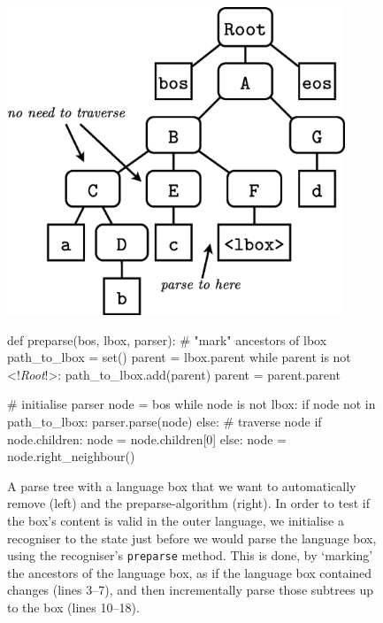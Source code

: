\documentclass[sigplan,screen]{acmart}\settopmatter{printfolios=true,printccs=false,printacmref=false}
\begin{document}
\begin{figure}
\begin{minipage}{0.45\textwidth}
\includegraphics[width=0.9\textwidth]{images/autoremoval}
\end{minipage}
\begin{minipage}{0.5\textwidth}
\begin{lstdefault}[basicstyle=\linespread{1.0}\footnotesize\ttfamily]
def preparse(bos, lbox, parser):
  # "mark" ancestors of lbox
  path_to_lbox = set()
  parent = lbox.parent
  while parent is not <!\textit{Root}!>:
    path_to_lbox.add(parent)
    parent = parent.parent

  # initialise parser
  node = bos
  while node is not lbox:
    if node not in path_to_lbox:
      parser.parse(node)
    else: # traverse node
      if node.children:
        node = node.children[0]
      else:
        node = node.right_neighbour()
\end{lstdefault}
\end{minipage}
\caption{A parse tree with a language box that we want to automatically remove (left)
and the preparse-algorithm (right). In
order to test if the box's content is valid in the outer language, we
initialise a recogniser to the state just before we would parse the language box,
using the recogniser's \texttt{preparse} method. This is done,
by `marking' the ancestors of the language box, as if the language box
contained changes (lines 3--7), and then incrementally parse those subtrees
up to the box (lines 10--18).}
\label{fig_preparse}
\end{figure}
\end{document}
